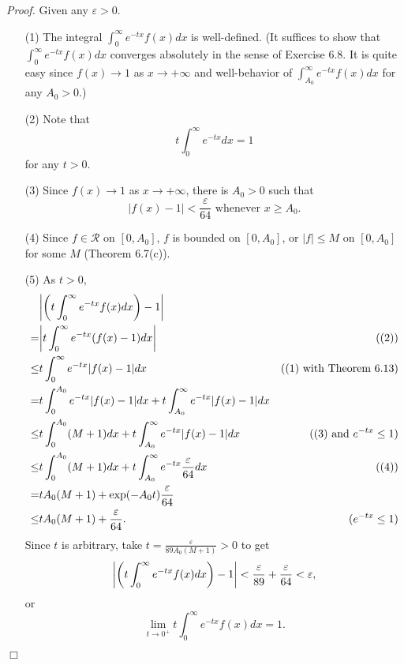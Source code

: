 \documentclass{article}
\begin{document}
\emph{Proof.}
Given any $\varepsilon > 0$.
\begin{enumerate}
\item[(1)]
The integral $\int_{0}^{\infty} e^{-tx}f(x)dx$ is well-defined.
(It suffices to show that $\int_{0}^{\infty} e^{-tx}f(x)dx$
converges absolutely in the sense of Exercise 6.8.
It is quite easy since $f(x) \to 1$ as $x \to +\infty$
and well-behavior of $\int_{A_0}^{\infty} e^{-tx}f(x)dx$ for any $A_0 > 0$.)

\item[(2)]
Note that
\[
  t \int_{0}^{\infty} e^{-tx} dx = 1
\]
for any $t > 0$.

\item[(3)]
Since $f(x) \to 1$ as $x \to +\infty$,
there is $A_0 > 0$ such that
\[
  |f(x) - 1| < \frac{\varepsilon}{64} \text{ whenever } x \geq A_0.
\]

\item[(4)]
Since $f \in \mathscr{R}$ on $[0,A_0]$,
$f$ is bounded on $[0,A_0]$,
or $|f| \leq M$ on $[0,A_0]$ for some $M$ (Theorem 6.7(c)).

\item[(5)]
As $t > 0$,
\begin{align*}
  &\abs{\left( t \int_{0}^{\infty} e^{-tx}f(x)dx \right) - 1} \\
  =& \abs{t \int_{0}^{\infty} e^{-tx}(f(x)-1)dx }
    &((2)) \\
  \leq& t \int_{0}^{\infty} e^{-tx}|f(x)-1|dx
    &\text{((1) with Theorem 6.13)} \\
  =& t \int_{0}^{A_0} e^{-tx}|f(x)-1|dx
    + t \int_{A_0}^{\infty} e^{-tx}|f(x)-1|dx \\
  \leq& t \int_{0}^{A_0}(M + 1) dx + t \int_{A_0}^{\infty} e^{-tx}|f(x)-1|dx
    &\text{((3) and $e^{-tx} \leq 1$)} \\
  \leq& t \int_{0}^{A_0}(M + 1) dx + t \int_{A_0}^{\infty} e^{-tx} \frac{\varepsilon}{64} dx
    &\text{((4))} \\
  =& t A_0 (M + 1) + \exp(-A_0t) \frac{\varepsilon}{64} \\
  \leq& t A_0 (M + 1) + \frac{\varepsilon}{64}.
    &\text{($e^{-tx} \leq 1$)}
\end{align*}
Since $t$ is arbitrary, take $t = \frac{\varepsilon}{89 A_0 (M+1)} > 0$ to get
\[
  \abs{\left( t \int_{0}^{\infty} e^{-tx}f(x)dx \right) - 1}
  < \frac{\varepsilon}{89} + \frac{\varepsilon}{64}
  < \varepsilon,
\]
or
\[
  \lim_{t \to 0^+} t \int_{0}^{\infty} e^{-tx}f(x)dx = 1.
\]
\end{enumerate}
$\Box$ \\\\
\end{document}
